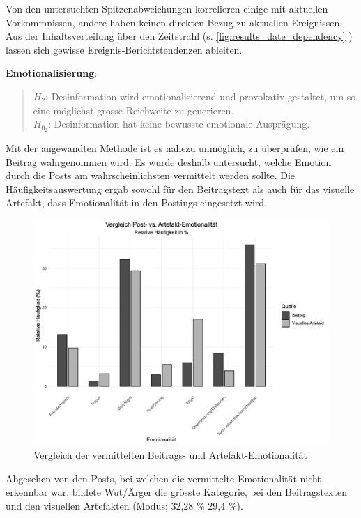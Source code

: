 \documentclass[12pt,a4paper]{article}        %
\begin{document}
Von den untersuchten Spitzenabweichungen korrelieren einige mit aktuellen Vorkommnissen, andere haben keinen direkten Bezug zu aktuellen Ereignissen. Aus der Inhaltsverteilung über den Zeitstrahl (s. \ref{fig:results_date_dependency} ) lassen sich gewisse Ereignis-Berichtstendenzen ableiten.

\textbf{Emotionalisierung}:
\begin{quote}
  \(H_2\): Desinformation wird emotionalisierend und provokativ gestaltet, um so eine möglichst grosse Reichweite zu generieren.\\
  \(H_{0_2}\): Desinformation hat keine bewusste emotionale Ausprägung.
\end{quote}
Mit der angewandten Methode ist es nahezu unmöglich, zu überprüfen, wie ein Beitrag wahrgenommen wird. Es wurde deshalb untersucht, welche Emotion durch die Posts am wahrscheinlichsten vermittelt werden sollte.
Die Häufigkeitsauswertung ergab sowohl für den Beitragstext als auch für das visuelle Artefakt, dass Emotionalität in den Postings eingesetzt wird.
\begin{figure}[H]
    \centering
    \includegraphics[width=1\linewidth]{images/sentiment_plot.png}
    \caption{Vergleich der vermittelten Beitrags- und Artefakt-Emotionalität}
    \label{fig:results_sentiment_plot}
\end{figure}
Abgesehen von den Posts, bei welchen die vermittelte Emotionalität nicht erkennbar war, bildete Wut/Ärger die grösste Kategorie, bei den Beitragstexten und den visuellen Artefakten (Modus; 32,28 \% \/ 29,4 \%).
\end{document}
